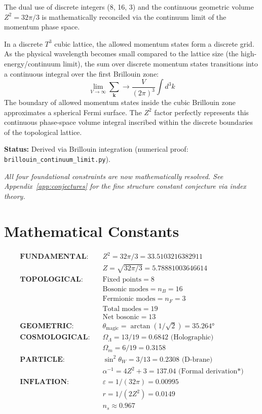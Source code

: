 \documentclass[12pt,a4paper]{article}
\newcommand{\Tthree}{T^3}
\newcommand{\OmegaL}{\Omega_\Lambda}
\newcommand{\OmegaM}{\Omega_m}
\newcommand{\sinW}{\sin^2\theta_W}
\newcommand{\nB}{n_B}
\newcommand{\nF}{n_F}
\newcommand{\Zsq}{Z^2}
\begin{document}
The dual use of discrete integers (8, 16, 3) and the continuous geometric volume $\Zsq = 32\pi/3$ is mathematically reconciled via the continuum limit of the momentum phase space.

In a discrete $\Tthree$ cubic lattice, the allowed momentum states form a discrete grid. As the physical wavelength becomes small compared to the lattice size (the high-energy/continuum limit), the sum over discrete momentum states transitions into a continuous integral over the first Brillouin zone:
\begin{equation}
\lim_{V \to \infty} \sum_{\mathbf{k}} \longrightarrow \frac{V}{(2\pi)^3} \int d^3k
\end{equation}
The boundary of allowed momentum states inside the cubic Brillouin zone approximates a spherical Fermi surface. The $\Zsq$ factor perfectly represents this continuous phase-space volume integral inscribed within the discrete boundaries of the topological lattice.

\textbf{Status:} Derived via Brillouin integration (numerical proof: \texttt{brillouin\_continuum\_limit.py}).

\vspace{1em}
\noindent\textit{All four foundational constraints are now mathematically resolved. See Appendix~\ref{app:conjectures} for the fine structure constant conjecture via index theory.}

\appendix

\section{Mathematical Constants}

\begin{align}
\textbf{FUNDAMENTAL:} \quad & \Zsq = 32\pi/3 = 33.5103216382911 \\
& Z = \sqrt{32\pi/3} = 5.78881003646614 \\[1em]
\textbf{TOPOLOGICAL:} \quad & \text{Fixed points} = 8 \\
& \text{Bosonic modes} = \nB = 16 \\
& \text{Fermionic modes} = \nF = 3 \\
& \text{Total modes} = 19 \\
& \text{Net bosonic} = 13 \\[1em]
\textbf{GEOMETRIC:} \quad & \theta_{\text{magic}} = \arctan(1/\sqrt{2}) = 35.264° \\[1em]
\textbf{COSMOLOGICAL:} \quad & \OmegaL = 13/19 = 0.6842 \text{ (Holographic)} \\
& \OmegaM = 6/19 = 0.3158 \\[1em]
\textbf{PARTICLE:} \quad & \sinW = 3/13 = 0.2308 \text{ (D-brane)} \\
& \alpha^{-1} = 4\Zsq + 3 = 137.04 \text{ (Formal derivation*)} \\[1em]
\textbf{INFLATION:} \quad & \varepsilon = 1/(32\pi) = 0.00995 \\
& r = 1/(2\Zsq) = 0.0149 \\
& n_s \approx 0.967
\end{align}
\end{document}
